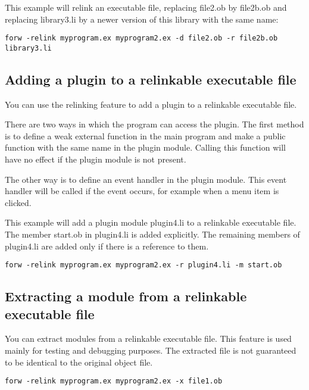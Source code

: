\documentclass[forwardcom.tex]{subfiles}
\begin{document}
This example will relink an executable file, replacing file2.ob by file2b.ob and replacing library3.li by a newer version of this library with the same name:
\begin{lstlisting}[frame=single]
forw -relink myprogram.ex myprogram2.ex -d file2.ob -r file2b.ob library3.li
\end{lstlisting}
\vspace{4mm}

\subsection{Adding a plugin to a relinkable executable file} \label{AddingAPlugin}
You can use the relinking feature to add a plugin to a relinkable executable file.
\vspace{2mm}

There are two ways in which the program can access the plugin. The first method is to define a weak external function in the main program and make a public function with the same name in the plugin module. Calling this function will have no effect if the plugin module is not present.
\vspace{2mm}

The other way is to define an event handler in the plugin module. This event handler will be called if the event occurs, for example when a menu item is clicked.
\vspace{2mm}

This example will add a plugin module plugin4.li to a relinkable executable file. The member start.ob in plugin4.li is added explicitly. The remaining members of plugin4.li are added only if there is a reference to them.
\begin{lstlisting}[frame=single]
forw -relink myprogram.ex myprogram2.ex -r plugin4.li -m start.ob
\end{lstlisting}
\vspace{4mm}

\subsection{Extracting a module from a relinkable executable file} \label{ExtractingFromRelinkable}
You can extract modules from a relinkable executable file. This feature is used mainly for testing and debugging purposes. The extracted file is not guaranteed to be identical to the original object file.
\vspace{2mm}

\begin{lstlisting}[frame=single]
forw -relink myprogram.ex myprogram2.ex -x file1.ob
\end{lstlisting}
\vspace{4mm}
\end{document}
